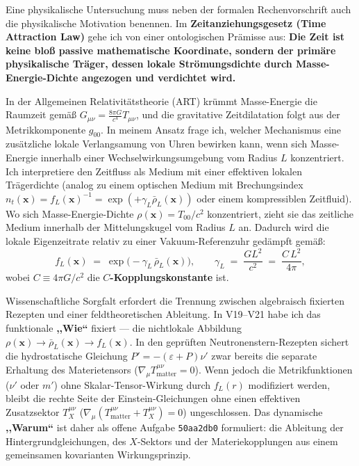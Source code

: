 \documentclass[10pt,a4paper]{article}
\begin{document}
Eine physikalische Untersuchung muss neben der formalen Rechenvorschrift auch die physikalische Motivation benennen. Im \textbf{Zeitanziehungsgesetz (Time Attraction Law)} gehe ich von einer ontologischen Pr\"amisse aus: \textbf{Die Zeit ist keine blo\ss{} passive mathematische Koordinate, sondern der prim\"are physikalische Tr\"ager, dessen lokale Str\"omungsdichte durch Masse-Energie-Dichte angezogen und verdichtet wird.}

\par
In der Allgemeinen Relativit\"atstheorie (ART) kr\"ummt Masse-Energie die Raumzeit gem\"a\ss{} $G_{\mu\nu} = \frac{8\pi G}{c^4}T_{\mu\nu}$, und die gravitative Zeitdilatation folgt aus der Metrikkomponente $g_{00}$. In meinem Ansatz frage ich, welcher Mechanismus eine zus\"atzliche lokale Verlangsamung von Uhren bewirken kann, wenn sich Masse-Energie innerhalb einer Wechselwirkungsumgebung vom Radius $L$ konzentriert. Ich interpretiere den Zeitfluss als Medium mit einer effektiven lokalen Tr\"agerdichte (analog zu einem optischen Medium mit Brechungsindex $n_t(\mathbf{x}) = f_L(\mathbf{x})^{-1} = \exp(+\gamma_L \bar{\rho}_L(\mathbf{x}))$ oder einem kompressiblen Zeitfluid). Wo sich Masse-Energie-Dichte $\rho(\mathbf{x}) = T_{00}/c^2$ konzentriert, zieht sie das zeitliche Medium innerhalb der Mittelungskugel vom Radius $L$ an. Dadurch wird die lokale Eigenzeitrate relativ zu einer Vakuum-Referenzuhr ged\"ampft gem\"a\ss :
\begin{equation}
  f_L(\mathbf{x}) \;=\; \exp\!\bigl(-\gamma_L\,\bar{\rho}_L(\mathbf{x})\bigr), \qquad \gamma_L \;=\; \frac{G L^2}{c^2} \;=\; \frac{C\,L^2}{4\pi},
\end{equation}
wobei $C \equiv 4\pi G/c^2$ die \textbf{$C$-Kopplungskonstante} ist.

\par
Wissenschaftliche Sorgfalt erfordert die Trennung zwischen algebraisch fixierten Rezepten und einer feldtheoretischen Ableitung. In V19--V21 habe ich das funktionale \textbf{,,Wie``} fixiert --- die nichtlokale Abbildung $\rho(\mathbf{x}) \to \bar{\rho}_L(\mathbf{x}) \to f_L(\mathbf{x})$. In den gepr\"uften Neutronenstern-Rezepten sichert die hydrostatische Gleichung $P' = -(\varepsilon+P)\nu'$ zwar bereits die separate Erhaltung des Materietensors ($\nabla_\mu T^{\mu\nu}_{\text{matter}} = 0$). Wenn jedoch die Metrikfunktionen ($\nu'$ oder $m'$) ohne Skalar-Tensor-Wirkung durch $f_L(r)$ modifiziert werden, bleibt die rechte Seite der Einstein-Gleichungen ohne einen effektiven Zusatzsektor $T^{\mu\nu}_X$ ($\nabla_\mu(T^{\mu\nu}_{\text{matter}} + T^{\mu\nu}_X) = 0$) ungeschlossen. Das dynamische \textbf{,,Warum``} ist daher als offene Aufgabe \texttt{50aa2db0} formuliert: die Ableitung der Hintergrundgleichungen, des $X$-Sektors und der Materiekopplungen aus einem gemeinsamen kovarianten Wirkungsprinzip.
\end{document}

